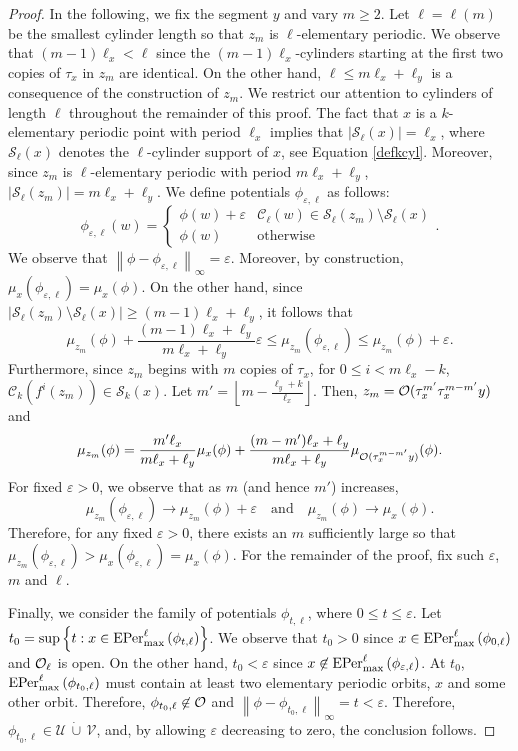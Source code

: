 \documentclass[11pt, reqno]{amsart}
\renewcommand{\epsilon}{\varepsilon}
\newcommand{\EPer}{{\rm EPer}}
\newcommand{\cC}{{\mathcal C}}
\newcommand{\cU}{{\mathcal U}}
\newcommand{\cV}{{\mathcal V}}
\newcommand{\cS}{{\mathcal S}}
\def\EPer{{\rm EPer}}
\begin{document}
\begin{proof}
In the following, we fix the segment $y$  and vary $m\geq 2$.
Let $\ell=\ell(m)$ be the smallest cylinder length so that $z_m$ is $\ell$-elementary periodic.  We observe that $(m-1)\ell_x<\ell$ since the $(m-1)\ell_x$-cylinders starting at the first two copies of $\tau_x$ in $z_m$ are identical.  On the other hand, $\ell\leq m\ell_x+\ell_y$ is a consequence of the construction of $z_m$.  We restrict our attention to cylinders of length $\ell$ throughout the remainder of this proof.  The fact that $x$ is a $k$-elementary periodic point with period $\ell_x$ implies that $|\cS_\ell(x)|=\ell_x$, where $\cS_\ell(x)$ denotes the $\ell$-cylinder support of $x$, see Equation \eqref{defkcyl}.  Moreover, since $z_m$ is $\ell$-elementary periodic with period $m\ell_x+\ell_y$, $|\cS_\ell(z_m)|=m\ell_x+\ell_y$.  We define potentials $\phi_{\epsilon,\ell}$ as follows:
$$
\phi_{\epsilon,\ell}(w)=\begin{cases}
\phi(w)+\epsilon&\cC_\ell(w)\in\cS_\ell(z_m)\setminus\cS_\ell(x)\\
\phi(w)&\text{otherwise}
\end{cases}.
$$
We observe that $\left\|\phi-\phi_{\epsilon,\ell}\right\|_\infty=\epsilon$.  Moreover, by construction, $\mu_x\left(\phi_{\epsilon,\ell}\right)=\mu_x(\phi)$.  On the other hand, since $|\cS_\ell(z_m)\setminus\cS_\ell(x)|\geq (m-1)\ell_x+\ell_y$, it follows that 
$$
\mu_{z_m}(\phi)+\frac{(m-1)\ell_x+\ell_y}{m\ell_x+\ell_y}\epsilon\leq\mu_{z_m}\left(\phi_{\epsilon,\ell}\right)\leq\mu_{z_m}(\phi)+\epsilon.
$$
Furthermore, since $z_m$ begins with $m$ copies of $\tau_x$, for $0\leq i<m\ell_x-k$, $\cC_k(f^i(z_m))\in\cS_k(x)$.  Let $m'=\left\lfloor m-\frac{\ell_y+k}{\ell_x}\right\rfloor$.  Then, $z_m=\mathcal O(\tau_x^{m'}\tau_x^{m-m'}y)$ and
$$
\mu_{z_m}(\phi)=\frac{m'\ell_x}{m\ell_x+\ell_y}\mu_x(\phi)+\frac{(m-m')\ell_x+\ell_y}{m\ell_x+\ell_y}\mu_{\mathcal O(\tau_x^{m-m'}y)}(\phi).
$$
For fixed $\epsilon>0$, we observe that as $m$ (and hence $m'$) increases, 
$$
\mu_{z_m}(\phi_{\epsilon,\ell})\rightarrow\mu_{z_m}(\phi)+\epsilon
\quad\text{and}\quad 
\mu_{z_m}(\phi)\rightarrow \mu_x(\phi).
$$
Therefore, for any fixed $\epsilon>0$, there exists an $m$ sufficiently large so that $\mu_{z_m}(\phi_{\epsilon,\ell})>\mu_{x}(\phi_{\epsilon,\ell})=\mu_x(\phi)$.  For the remainder of the proof, fix such $\epsilon$, $m$ and $\ell$.

Finally, we consider the family of potentials $\phi_{t,\ell}$, where $0\leq t\leq \epsilon$.  Let $t_0=\sup\left\{t:x\in\EPer_{\max}^\ell\left(\phi_{t,\ell}\right)\right\}$.  We observe that $t_0>0$ since $x\in\EPer_{\max}^\ell\left(\phi_{0,\ell}\right)$ and $\mathcal O_\ell$ is open.  On the other hand, $t_0<\epsilon$ since $x\not\in\EPer_{\max}^\ell\left(\phi_{\epsilon,\ell}\right)$.  At $t_0$, $\EPer_{\max}^\ell\left(\phi_{t_0,\ell}\right)$ must contain at least two elementary periodic orbits, $x$ and some other orbit.  Therefore, $\phi_{t_0,\ell}\not\in\mathcal O$ and $\left\|\phi-\phi_{t_0,\ell}\right\|_\infty=t<\epsilon$.  Therefore, $\phi_{t_0,\ell}\in\cU\,\dot\cup\,\cV$, and, by allowing $\epsilon$ decreasing to zero, the conclusion follows.
\end{proof}



\end{document}
